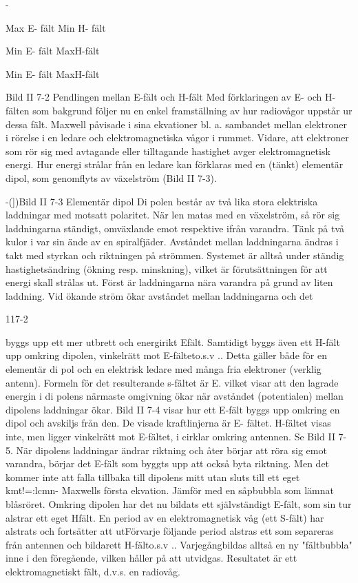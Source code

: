 \documentclass[a4paper,twoside,twocolumn,openright]{book}
\begin{document}
{{{{{{-

Max E- fält
Min H- fält

Min E- fält
MaxH-fält

Min E- fält
MaxH-fält

Bild II 7-2 Pendlingen mellan E-fält och H-fält
Med förklaringen av E- och H-fälten som
bakgrund följer nu en enkel framställning av
hur radiovågor uppstår ur dessa fält.
Maxwell påvisade i sina ekvationer bl. a.
sambandet mellan elektroner i rörelse i en
ledare och elektromagnetiska vågor i rummet. Vidare, att elektroner som rör sig med
avtagande eller tilltagande hastighet avger
elektromagnetisk energi.
Hur energi strålar från en ledare kan förklaras med en (tänkt) elementär dipol, som
genomflyts av växelström (Bild II 7-3).

-(])Bild II 7-3 Elementär dipol
Di polen består av två lika stora elektriska
laddningar med motsatt polaritet. När
len matas med en växelström, så rör sig
laddningarna ständigt, omväxlande emot
respektive ifrån varandra. Tänk på två kulor
i var sin ände av en spiralfjäder. Avståndet
mellan laddningarna ändras i takt med styrkan och riktningen på strömmen. Systemet
är alltså under ständig hastighetsändring
(ökning resp. minskning), vilket är förutsättningen för att energi skall strålas ut.
Först är laddningarna nära varandra på
grund av liten laddning. Vid ökande ström
ökar avståndet mellan laddningarna och det

117-2

byggs upp ett mer utbrett och energirikt Efält. Samtidigt byggs även ett H-fält upp
omkring dipolen, vinkelrätt mot E-fälteto.s.v ..
Detta gäller både för en elementär di pol och
en elektrisk ledare med många fria elektroner (verklig antenn).
Formeln för det resulterande s-fältet är
E. vilket visar att den lagrade energin
i di polens närmaste omgivning ökar när avståndet (potentialen) mellan dipolens laddningar ökar.
Bild II 7-4 visar hur ett E-fält byggs upp
omkring en dipol och avskiljs från den. De
visade kraftlinjerna är E- fältet. H-fältet visas
inte, men ligger vinkelrätt mot E-fältet, i cirklar omkring antennen. Se Bild II 7-5.
När dipolens laddningar ändrar riktning
och åter börjar att röra sig emot varandra,
börjar det E-fält som byggts upp att också
byta riktning. Men det kommer inte att falla
tillbaka till dipolens mitt utan sluts till ett eget
kmt!=:lcmn- Maxwells första ekvation. Jämför
med en såpbubbla som lämnat blåsröret.
Omkring dipolen har det nu bildats ett självständigt E-fält, som sin tur alstrar ett eget Hfält.
En period av en elektromagnetisk våg
(ett S-fält) har alstrats och fortsätter att utFörvarje följande period alstras ett
som separeras från antennen och
bildarett
H-fälto.s.v .. Varjegångbildas
alltså en ny "fältbubbla" inne i den föregående, vilken håller på att utvidgas.
Resultatet är ett elektromagnetiskt fält,
d.v.s. en radiovåg.

}}}}}}
\end{document}
